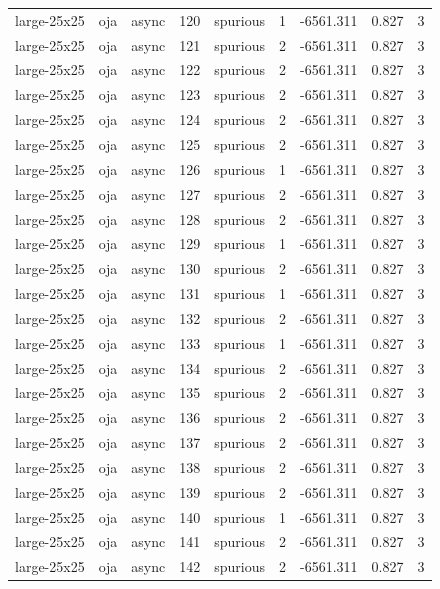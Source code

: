 \begin{tabular}{lllrlrrrr}
large-25x25 & oja & async & 120 & spurious & 1 & -6561.311 & 0.827 & 3 \\
large-25x25 & oja & async & 121 & spurious & 2 & -6561.311 & 0.827 & 3 \\
large-25x25 & oja & async & 122 & spurious & 2 & -6561.311 & 0.827 & 3 \\
large-25x25 & oja & async & 123 & spurious & 2 & -6561.311 & 0.827 & 3 \\
large-25x25 & oja & async & 124 & spurious & 2 & -6561.311 & 0.827 & 3 \\
large-25x25 & oja & async & 125 & spurious & 2 & -6561.311 & 0.827 & 3 \\
large-25x25 & oja & async & 126 & spurious & 1 & -6561.311 & 0.827 & 3 \\
large-25x25 & oja & async & 127 & spurious & 2 & -6561.311 & 0.827 & 3 \\
large-25x25 & oja & async & 128 & spurious & 2 & -6561.311 & 0.827 & 3 \\
large-25x25 & oja & async & 129 & spurious & 1 & -6561.311 & 0.827 & 3 \\
large-25x25 & oja & async & 130 & spurious & 2 & -6561.311 & 0.827 & 3 \\
large-25x25 & oja & async & 131 & spurious & 1 & -6561.311 & 0.827 & 3 \\
large-25x25 & oja & async & 132 & spurious & 2 & -6561.311 & 0.827 & 3 \\
large-25x25 & oja & async & 133 & spurious & 1 & -6561.311 & 0.827 & 3 \\
large-25x25 & oja & async & 134 & spurious & 2 & -6561.311 & 0.827 & 3 \\
large-25x25 & oja & async & 135 & spurious & 2 & -6561.311 & 0.827 & 3 \\
large-25x25 & oja & async & 136 & spurious & 2 & -6561.311 & 0.827 & 3 \\
large-25x25 & oja & async & 137 & spurious & 2 & -6561.311 & 0.827 & 3 \\
large-25x25 & oja & async & 138 & spurious & 2 & -6561.311 & 0.827 & 3 \\
large-25x25 & oja & async & 139 & spurious & 2 & -6561.311 & 0.827 & 3 \\
large-25x25 & oja & async & 140 & spurious & 1 & -6561.311 & 0.827 & 3 \\
large-25x25 & oja & async & 141 & spurious & 2 & -6561.311 & 0.827 & 3 \\
large-25x25 & oja & async & 142 & spurious & 2 & -6561.311 & 0.827 & 3 \\

\end{tabular}
